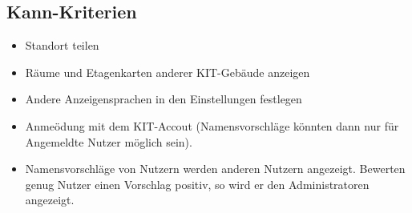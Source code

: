 \subsection{Kann-Kriterien}

\begin{itemize}

    \item Standort teilen 
    \item Räume und Etagenkarten anderer KIT-Gebäude anzeigen
    \item Andere Anzeigensprachen in den Einstellungen festlegen
    \item Anmeödung mit dem KIT-Accout (Namensvorschläge könnten dann nur für Angemeldte Nutzer möglich sein).
    \item Namensvorschläge von Nutzern werden anderen Nutzern angezeigt. Bewerten genug Nutzer einen 
    Vorschlag positiv, so wird er den Administratoren angezeigt.
    
        

\end{itemize}